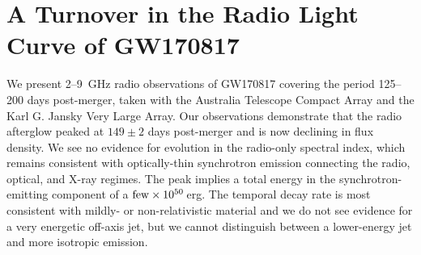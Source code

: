 \chapter{A Turnover in the Radio Light Curve of GW170817}
\label{chap:gw170817_turnover}
\begingroup



\endgroup

We present 2--9~GHz radio observations of GW170817 covering the period 125--200 days post-merger, taken with the Australia Telescope Compact Array and the Karl G. Jansky Very Large Array. Our observations demonstrate that the radio afterglow peaked at $149\pm2$ days post-merger and is now declining in flux density. We see no evidence for evolution in the radio-only spectral index, which remains consistent with optically-thin synchrotron emission connecting the radio, optical, and X-ray regimes. The peak implies a total energy in the synchrotron-emitting component of a ${\rm few}\times 10^{50}$\,erg. The temporal decay rate is most consistent with mildly- or non-relativistic material and we do not see evidence for a very energetic off-axis jet, but we cannot distinguish between a lower-energy jet and more isotropic emission. 

\clearpage
\pagebreak
